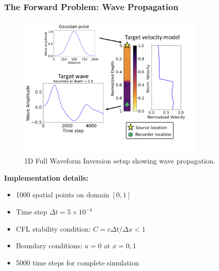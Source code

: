 \documentclass[notes]{beamer}
\begin{document}
\begin{frame}
\frametitle{The Forward Problem: Wave Propagation}

\begin{figure}[ht]
	\centering
	\includegraphics[width=0.8\textwidth]{figs/1dfwi.png}
	\caption*{1D Full Waveform Inversion setup showing wave propagation.}
\end{figure}

\textbf{Implementation details:}
\begin{itemize}
    \item 1000 spatial points on domain $[0, 1]$
    \item Time step $\Delta t = 5 \times 10^{-4}$
    \item CFL stability condition: $C = c\Delta t/\Delta x < 1$
    \item Boundary conditions: $u = 0$ at $x = 0, 1$
    \item 5000 time steps for complete simulation
\end{itemize}

\end{frame}
\end{document}

